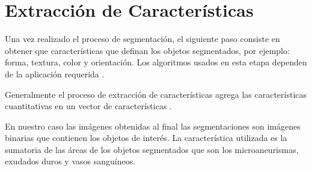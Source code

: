 \section{Extracción de Características}
Una vez realizado el proceso de segmentación, el  siguiente  paso  consiste en obtener que características que definan los objetos segmentados, por ejemplo: forma, textura, color y orientación. Los algoritmos 
usados en esta etapa dependen de la aplicación requerida \cite{nayak2008automated,qiu2005image,cui2008edge}.

Generalmente el proceso de extracción de características agrega las características cuantitativas en un vector de características \cite{wernick2010machine}.





En nuestro caso las imágenes  obtenidas al final las segmentaciones son imágenes binarias que contienen los objetos de interés. La característica utilizada es la sumatoria de las áreas de los objetos segmentados que son los microaneurismas, exudados duros y vasos sanguíneos.




 

